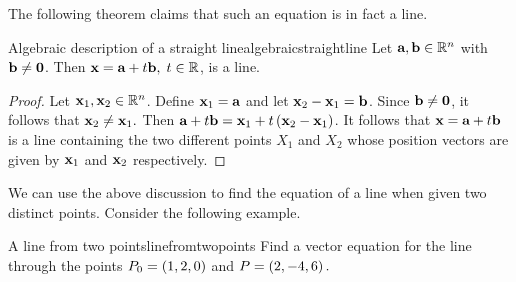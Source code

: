 The following theorem claims that such an equation is in fact a line. 

\begin{proposition}{Algebraic description of a straight line}{algebraicstraightline}
Let $\mbox{\bf a},\mbox{\bf b}\in \mathbb{R}^{n}$ with $\mbox{\bf b}\neq \mbox{\bf 0}$. 
Then $\mbox{\bf x}=\mbox{\bf a}+t\mbox{\bf b},\; t\in \mathbb{R}$, is a
line.
\end{proposition}

\begin{proof}
Let $\mbox{\bf x}_1, \mbox{\bf x}_2 \in \mathbb{R}^n$. 
Define $\mbox{\bf x}_1=\mbox{\bf a}$ and let $\mbox{\bf x}_2-\mbox{\bf x}_1=\mbox{\bf b}$.
Since $\mbox{\bf b} \neq \mbox{\bf 0}$, it follows that $\mbox{\bf x}_2\neq \mbox{\bf x}_1.$ Then
$\mbox{\bf a}+t\mbox{\bf b}=\mbox{\bf x}_1 + t\left(\mbox{\bf x}_2-\mbox{\bf x}_1\right) $. It follows that  
$\mbox{\bf x}=\mbox{\bf a}+t\mbox{\bf b}$ is a line containing the two different points 
$X_1$ and $X_2$ whose position vectors are given by $\mbox{\bf x}_1$ and $\mbox{\bf x}_2$ respectively. 
\end{proof}

We can use the above discussion to find the equation of a line when given two distinct points.
Consider the following example. 

\begin{example}{A line from two points}{linefromtwopoints}
Find a vector equation for the line through the points $P_0 = \left(
1,2,0\right) $ and $P = \left(2,-4,6\right).$
\end{example}

